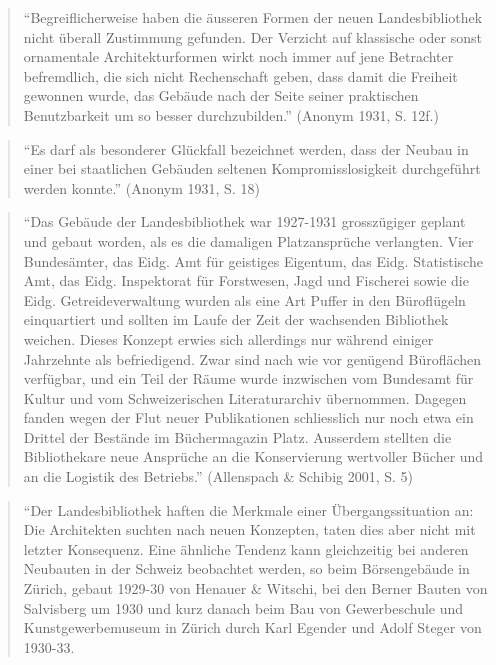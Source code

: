 \documentclass[a4paper,
fontsize=11pt,
oneside,
numbers=noperiodatend,
parskip=half-,
bibliography=totoc,
final
]{scrartcl}
\begin{document}
\begin{quote}
\enquote{Begreiflicherweise haben die äusseren Formen der neuen
Landesbibliothek nicht überall Zustimmung gefunden. Der Verzicht auf
klassische oder sonst ornamentale Architekturformen wirkt noch immer auf
jene Betrachter befremdlich, die sich nicht Rechenschaft geben, dass
damit die Freiheit gewonnen wurde, das Gebäude nach der Seite seiner
praktischen Benutzbarkeit um so besser durchzubilden.} (Anonym 1931, S.
12f.)
\end{quote}

\begin{quote}
\enquote{Es darf als besonderer Glückfall bezeichnet werden, dass der
Neubau in einer bei staatlichen Gebäuden seltenen Kompromisslosigkeit
durchgeführt werden konnte.} (Anonym 1931, S. 18)
\end{quote}

\begin{quote}
\enquote{Das Gebäude der Landesbibliothek war 1927-1931 grosszügiger
geplant und gebaut worden, als es die damaligen Platzansprüche
verlangten. Vier Bundesämter, das Eidg. Amt für geistiges Eigentum, das
Eidg. Statistische Amt, das Eidg. Inspektorat für Forstwesen, Jagd und
Fischerei sowie die Eidg. Getreideverwaltung wurden als eine Art Puffer
in den Büroflügeln einquartiert und sollten im Laufe der Zeit der
wachsenden Bibliothek weichen. Dieses Konzept erwies sich allerdings nur
während einiger Jahrzehnte als befriedigend. Zwar sind nach wie vor
genügend Büroflächen verfügbar, und ein Teil der Räume wurde inzwischen
vom Bundesamt für Kultur und vom Schweizerischen Literaturarchiv
übernommen. Dagegen fanden wegen der Flut neuer Publikationen
schliesslich nur noch etwa ein Drittel der Bestände im Büchermagazin
Platz. Ausserdem stellten die Bibliothekare neue Ansprüche an die
Konservierung wertvoller Bücher und an die Logistik des Betriebs.}
(Allenspach \& Schibig 2001, S. 5)
\end{quote}

\begin{quote}
``Der Landesbibliothek haften die Merkmale einer Übergangssituation an:
Die Architekten suchten nach neuen Konzepten, taten dies aber nicht mit
letzter Konsequenz. Eine ähnliche Tendenz kann gleichzeitig bei anderen
Neubauten in der Schweiz beobachtet werden, so beim Börsengebäude in
Zürich, gebaut 1929-30 von Henauer \& Witschi, bei den Berner Bauten von
Salvisberg um 1930 und kurz danach beim Bau von Gewerbeschule und
Kunstgewerbemuseum in Zürich durch Karl Egender und Adolf Steger von
1930-33.
\end{quote}
\end{document}
